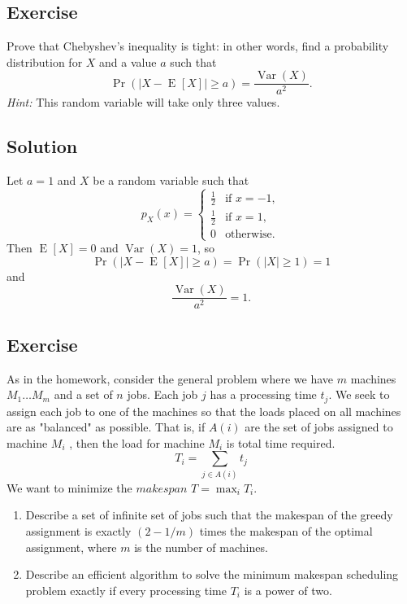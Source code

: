 \documentclass[14pt]{extreport}
\newcounter{counter}
\newcommand{\Exercise}{Exercise \stepcounter{counter}\thecounter}
\newcommand{\Var}[1]{\operatorname{Var}\left(#1\right)}
\newcommand{\E}[2][]{\operatorname{E}_{#1}\left[#2\right]}
\renewcommand{\Pr}[2][]{\operatorname{Pr}_{#1}\left(#2\right)}
\begin{document}


\subsection*{\Exercise}
    Prove that Chebyshev's inequality is tight: in other words, find a probability distribution for $X$ and a value $a$ such that
    \begin{equation*}
        \Pr{|X - \E{X}| \geq a} = \frac{\Var{X}}{a^2}.
    \end{equation*}
    \textit{Hint:} This random variable will take only three values.

\subsection*{Solution}
    Let $a = 1$ and $X$ be a random variable such that $$p_{X}(x) = 
    \begin{cases}
        \frac{1}{2} & \text{if $x = -1$}, \\
        \frac{1}{2} & \text{if $x = 1$}, \\
        0 & \text{otherwise.}
    \end{cases}$$
    Then $\E{X} = 0$ and $\Var{X} = 1$, so $$\Pr{|X - \E{X}| \geq a} = \Pr{|X| \ge 1} = 1$$ and $$\frac{\Var{X}}{a^2} = 1.$$

\subsection*{\Exercise}
    As in the homework, consider the general problem where we have $m$ machines $M_1 \ldots M_m$ and a set of $n$ jobs. Each job $j$ has a processing time $t_j$. We seek to assign each job to one of the machines so that the loads placed on all machines are as "balanced" as possible. That is, if $A(i)$ are the set of jobs assigned to machine $M_i$ , then the load for machine $M_i$ is total time required.  \[ T_i = \sum_{j \in A(i)} t_j\] We want to minimize the $makespan$ $T = \max_i T_i$.
    \begin{enumerate}
        \item Describe a set of infinite set of jobs such that the makespan of the greedy assignment is exactly $(2 - 1/m)$ times the makespan of the optimal assignment, where $m$ is the number of machines.
        \item  Describe an efficient algorithm to solve the minimum makespan scheduling
        problem exactly if every processing time $T_{i}$ is a power of two.
    \end{enumerate}
\end{document}
